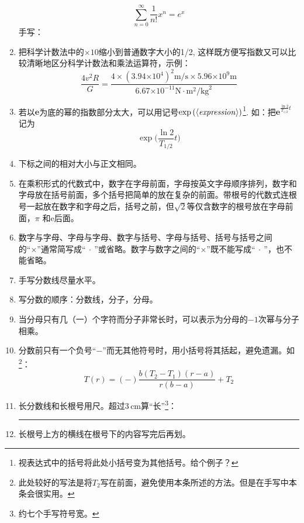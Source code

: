 \documentclass[11pt, a4paper]{article}
\begin{document}
\begin{enumerate}
\begin{displaymath}
    \sum_{n=0}^\infty \frac{1}{n!} x^{n} = e^{x}
    \end{displaymath}
    手写：\\[60pt]
\item 把科学计数法中的$\scriptstyle\times10$缩小到普通数字大小的1/2, 这样既方便写指数又可以比较清晰地区分科学计数法和乘法运算符，示例：
    \begin{displaymath}
    \frac{4v^{2}R}{G} = \frac{4 \times (3.94{\scriptstyle\times10}^{4})^{2}\mathrm{m}/\mathrm{s} \times 5.96{\scriptstyle\times10}^{9}\mathrm{m}}{6.67{\scriptstyle\times10}^{-11}\mathrm{N}\cdot \mathrm{m}^{2}/\mathrm{kg}^{2}}
    \end{displaymath}
\item \label{brace}若以$\mathbf{e}$为底的幂的指数部分太大，可以用记号$\exp\left(\langle\text{\emph{expression}}\rangle\right)$\footnote{视表达式中的括号将此处小括号变为其他括号。{给个例子？}}. 如：把$\mathbf{e}^{\frac{\ln2}{T_{1/2}}t}$ 记为
    \begin{displaymath}
    \exp\biggl( \frac{\ln2}{T_{1/2}}t \biggr)
    \end{displaymath}
\item 下标之间的相对大小与正文相同。
\item 在乘积形式的代数式中，数字在字母前面，字母按英文字母顺序排列，数字和字母放在括号前面，多个括号把简单的放在复杂的前面。带根号的代数式连根号一起放在数字和字母之后，括号之前，但$\sqrt{2}$等仅含数字的根号放在字母前面，$\pi$ 和$\mathrm{e}$后面。
\item 数字与字母、字母与字母、数字与括号、字母与括号、括号与括号之间的``×''通常简写成``$\:\cdot\:$''或省略。数字与数字之间的``×''既不能写成``$\:\cdot\:$''，也不能省略。
\item 手写分数线尽量水平。
\item 写分数的顺序：分数线，分子，分母。
\item 当分母只有几（一）个字符而分子非常长时，可以表示为分母的$-1$次幂与分子相乘。
\item 分数前只有一个负号``$-$''而无其他符号时，用小括号将其括起，避免遗漏。如\footnote{此处较好的写法是将$T_{2}$写在前面，避免使用本条所述的方法。但是在手写中本条会很实用。}：
    \begin{displaymath}
    T(r) = (-)\frac{b(T_{2}-T_{1})(r-a)}{r(b-a)} + T_{2}
    \end{displaymath}
\item 长分数线和长根号用尺。超过$3\,\mathrm{cm}$算“长”\footnote{约七个手写符号宽。}：\rule[2pt]{3cm}{0.6pt}
\item 长根号上方的横线在根号下的内容写完后再划。

\end{enumerate}
\end{document}
